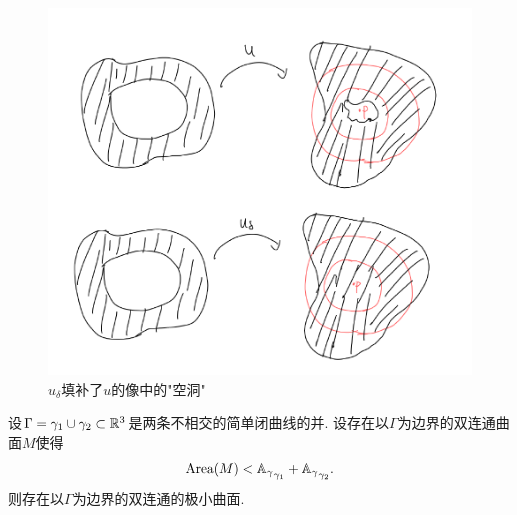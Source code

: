 \begin{figure}[ht]
    \centering
    \includegraphics[scale=0.5]{images/contraction.png}
    \caption{$u_\delta$填补了$u$的像中的"空洞"}
    \label{aaaanonlabel}
\end{figure}
\begin{theorem}
    设$\Gamma= \gamma_1 \cup \gamma_2 \subset {\mathbb{R}}^3$是两条不相交的简单闭曲线的并. 设存在以$\Gamma$为边界的双连通曲面$M$使得
    \begin{equation} \label{douglas_condition_annulus}
        \text{Area}(M) < {\mathbb{A}_\gamma}_{\gamma_1}+{\mathbb{A}_\gamma}_{\gamma_2}.
    \end{equation}
    则存在以$\Gamma$为边界的双连通的极小曲面.
\end{theorem}
